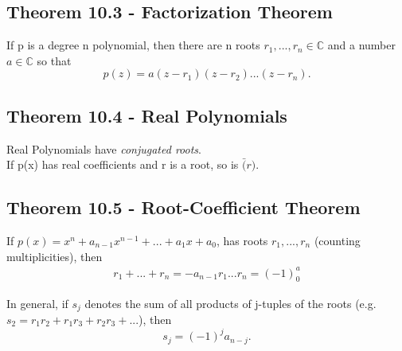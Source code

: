 \documentclass{article}
\theoremstyle{definition}
\theoremstyle{definition}
\theoremstyle{remark}
\begin{document}
\subsection{Theorem 10.3 - Factorization Theorem}
If p is a degree n polynomial, then there are n roots ${r}_{1},...,{r}_{n} \in \mathbb{C}$ 
and a number $a \in \mathbb{C}$ so that 
\begin{equation}
    p(z)=a(z-{r}_{1})(z-{r}_{2})...(z-{r}_{n}).
\end{equation}

\subsection{Theorem 10.4 - Real Polynomials}
Real Polynomials have \emph{conjugated roots}. \\
If p(x) has real coefficients and r is a root, so is $\bar(r)$.


\subsection{Theorem 10.5 - Root-Coefficient Theorem} 
If $ p(x) = x^n +{a}_{n-1}x^{n-1}+ ... + {a}_{1}x+{a}_{0}$, has roots ${r}_{1},...,{r}_{n}$ (counting multiplicities), 
then
\begin{equation}
\begin{aligned}
    {r}_{1}+ ... +{r}_{n} = -{a}_{n-1}
    {r}_{1}...{r}_{n} = (-1)^{a}_{0}
\end{aligned}
\end{equation}

In general, if ${s}_{j}$ denotes the sum of all products of j-tuples of the roots 
(e.g. ${s}_{2} = {r}_{1}{r}_{2}+{r}_{1}{r}_{3}+{r}_{2}{r}_{3}+...$), then\\
\begin{equation}
    {s}_{j}=(-1)^j {a}_{n-j}.
\end{equation}
\end{document}
